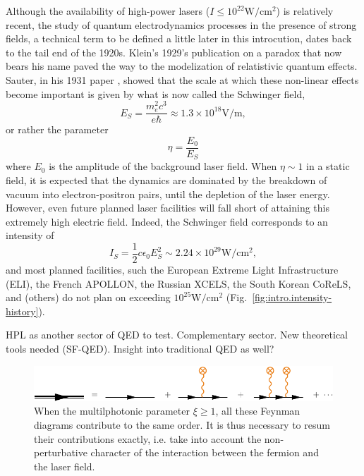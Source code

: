 \documentclass[11pt,SymmetricalJury]{inrsthesis/inrsthesis}
\begin{document}
Although the availability of high-power lasers ($I\leq10^{22}\si{\watt\per\cm\squared}$)
is relatively recent, the study of quantum electrodynamics processes in the presence
of strong fields, a technical term to be defined a little later in this introcution,
dates back to the tail end of the 1920s. Klein's 1929's publication \cite{Klein1929} on a paradox
that now bears his name paved the way to the modelization of relatistivic
quantum effects. Sauter, in his 1931 paper \cite{SAU1931}, showed that the scale at which
these non-linear effects become important is given by what is now called
the Schwinger field,
  \begin{equation}
    E_S = \frac{m_e^2c^3}{e\hbar} \approx 1.3\times10^{18}\si{\volt\per\meter},
  \end{equation}
or rather the parameter
  \begin{equation}
    \eta = \frac{E_0}{E_S}
  \end{equation}
where $E_0$ is the amplitude of the background laser field. When $\eta\sim1$
in a static field,
it is expected that the dynamics are dominated by the breakdown of vacuum
into electron-positron pairs, until the depletion of the laser energy.
However, even future planned laser facilities will fall short of attaining
this extremely high electric field. Indeed, the Schwinger field corresponds
to an intensity of
  \begin{equation}
    I_S = \frac{1}{2}c\epsilon_0E_S^2\sim 2.24\times10^{29}\si{\watt\per\cm\squared},
  \end{equation}
and most planned facilities, such the European Extreme Light Infrastructure (ELI),
the French APOLLON, the Russian XCELS, the South Korean CoReLS, and (others)
do not plan on exceeding $10^{25}\si{\watt\per\cm\squared}$ (Fig.~\ref{fig:intro.intensity-history}).

HPL as another sector of QED to test. Complementary sector. New theoretical tools
needed (SF-QED). Insight into traditional QED as well?



\begin{figure}
  \centering
  \includegraphics{figs/ResummedPropagator.pdf}
  \caption[Resummation of multiphotonic effects on the fermion propagator.]
          {When the multilphotonic parameter $\xi\geq1$, all these Feynman
          diagrams contribute to the same order. It is thus necessary to
          resum their contributions exactly, i.e. take into account
          the non-perturbative character of the interaction between the
          fermion and the laser field.}
  \label{fig:intro.resummed-propagator}
\end{figure}
\end{document}
